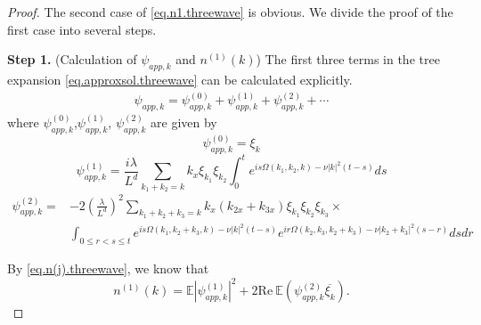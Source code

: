 \begin{proof} The second case of \eqref{eq.n1.threewave} is obvious. We divide the proof of the first case into several steps.

\textbf{Step 1.} (Calculation of $\psi_{app,k}$ and $n^{(1)}(k)$) The first three terms in the tree expansion \eqref{eq.approxsol.threewave} can be calculated explicitly. 
\begin{equation}
\begin{split}
    \psi_{app,k}=\psi^{(0)}_{app,k}+\psi^{(1)}_{app,k}+\psi^{(2)}_{app,k}+\cdots
\end{split}
\end{equation}
where $\psi^{(0)}_{app,k}$,$\psi^{(1)}_{app,k}$, $\psi^{(2)}_{app,k}$ are given by
\begin{equation}
    \psi^{(0)}_{app,k}=\xi_k
\end{equation}
\begin{equation}
    \psi^{(1)}_{app,k}=\frac{i\lambda}{L^{d}} \sum\limits_{k_1+k_2=k} k_{x}\xi_{k_1} \xi_{k_2} \int^{t}_0e^{i s\Omega(k_1,k_2,k)- \nu|k|^2(t-s)} ds
\end{equation}
\begin{equation}
\begin{split}
    \psi^{(2)}_{app,k}=&-2\left(\frac{\lambda}{L^{d}}\right)^2 \sum\limits_{k_1+k_2+k_3=k} k_{x}(k_{2x}+k_{3x})\xi_{k_1} \xi_{k_2}\xi_{k_3}\times
    \\
    &\int_{0\le r<s\le t}e^{i s\Omega(k_1,k_2+k_3,k)- \nu|k|^2(t-s)} e^{i r\Omega(k_2,k_3,k_2+k_3)- \nu|k_2+k_3|^2(s-r)} dsdr
\end{split}
\end{equation}

By \eqref{eq.n(j).threewave}, we know that
\begin{equation}\label{eq.n(1).threewave}
    n^{(1)}(k)=\mathbb E \left|\psi^{(1)}_{app,k}\right|^2+ 2\text{Re}\  \mathbb E \left(\psi^{(2)}_{app,k}\overline{\xi_k}\right).
\end{equation}


\end{proof}
